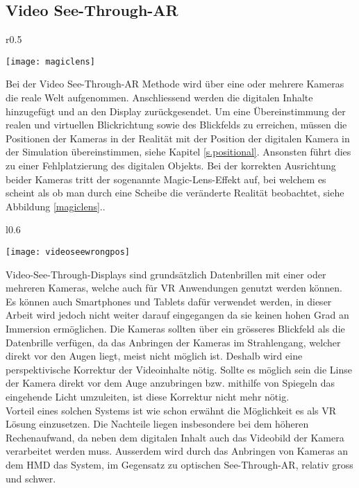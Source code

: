 \subsection*{Video See-Through-AR}
\begin{wrapfigure}{r}{0.5\textwidth}
	\vspace{-20pt}
	\begin{center}
		\texttt{[image: magiclens]}
	\end{center}
	\vspace{-15pt}
	\caption{Magic-Lens-Effekt}\label{magiclens}
	\vspace{-10pt}
\end{wrapfigure}
Bei der Video See-Through-AR Methode wird über eine oder mehrere Kameras die reale Welt aufgenommen. Anschliessend werden die digitalen Inhalte hinzugefügt und an den Display zurückgesendet. Um eine Übereinstimmung der realen und virtuellen Blickrichtung sowie des Blickfelds zu erreichen, müssen die Positionen der Kameras in der Realität mit der Position der digitalen Kamera in der Simulation übereinstimmen, siehe Kapitel \ref{s.positional}. Ansonsten führt dies zu einer Fehlplatzierung des digitalen Objekts. Bei der korrekten Ausrichtung beider Kameras tritt der sogenannte Magic-Lens-Effekt auf, bei welchem es scheint als ob man durch eine Scheibe die veränderte Realität beobachtet, siehe Abbildung \ref{magiclens}.\cite[S.~248]{doerner13}.

\begin{wrapfigure}{l}{0.6\textwidth}
	\vspace{-20pt}
	\begin{center}
		\texttt{[image: videoseewrongpos]}
	\end{center}
	\vspace{-15pt}
	\captionsetup{width=0.5\textwidth}
	\caption{Beispielaufbau Video See-Through-AR}\label{videoseewrongpos}
	\vspace{-10pt}
\end{wrapfigure}
Video-See-Through-Displays sind grundsätzlich Datenbrillen mit einer oder mehreren Kameras, welche auch für VR Anwendungen genutzt werden können. Es können auch Smartphones und Tablets dafür verwendet werden, in dieser Arbeit wird jedoch nicht weiter darauf eingegangen da sie keinen hohen Grad an Immersion ermöglichen. Die Kameras sollten über ein grösseres Blickfeld als die Datenbrille verfügen, da das Anbringen der Kameras im Strahlengang, welcher direkt vor den Augen liegt, meist nicht möglich ist. Deshalb wird eine perspektivische Korrektur der Videoinhalte nötig. Sollte es möglich sein die Linse der Kamera direkt vor dem Auge anzubringen bzw. mithilfe von Spiegeln das eingehende Licht umzuleiten, ist diese Korrektur nicht mehr nötig.\cite[S.~271 ff.]{doerner13}\\[6pt]
Vorteil eines solchen Systems ist wie schon erwähnt die Möglichkeit es als VR Lösung einzusetzen. Die Nachteile liegen insbesondere bei dem höheren Rechenaufwand, da neben dem digitalen Inhalt auch das Videobild der Kamera verarbeitet werden muss. Ausserdem wird durch das Anbringen von Kameras an dem HMD das System, im Gegensatz zu optischen See-Through-AR, relativ gross und schwer.
\newpage
